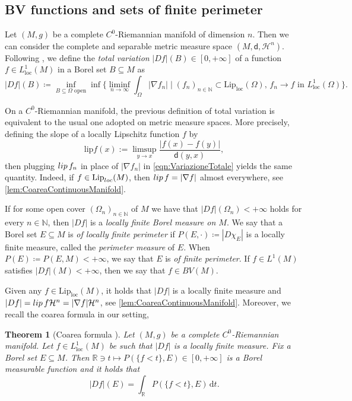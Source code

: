 \documentclass[a4paper,12pt,reqno]{amsart}
\numberwithin{equation}{section}
\theoremstyle{plain}
\newtheorem{theorem}{Theorem}[section]
\theoremstyle{definition}
\theoremstyle{remark}
\newcommand{\N}{\mathbb{N}}
\newcommand{\R}{\mathbb{R}}
\newcommand{\lip}{{\rm lip \,}}
\DeclareMathOperator{\Lip}{Lip}
\newcommand{\haus}{\mathcal{H}}
\newcommand{\dist}{\mathsf{d}}
\newcommand{\de}{\ensuremath{\,\mathrm d}} %
\begin{document}
{\subsection{BV functions and sets of finite perimeter}\label{sec:Perimeter}

Let $(M,g)$ be a complete $C^0$-Riemannian manifold of dimension $n$. Then we can consider the complete and separable metric measure space $(M,\dist,\mathcal{H}^n)$.
Following \cite{MIRANDA2003, ADM14}, we define the \emph{total variation} \(|Df|(B)\in[0,+\infty]\) of a function \(f\in L^1_{\mathrm{loc}}(M)\) in a Borel set \(B\subseteq M\) as
\begin{equation}\label{eqn:VariazioneTotale}
|Df|(B)\coloneqq\inf_{B\subseteq\Omega\text{ open}}\inf\bigg\{\liminf_{n\to\infty}\int_\Omega |\nabla f_n|\;\bigg|\;
(f_n)_{n\in\N}\subset\mathrm{Lip}_{\mathrm{loc}}(\Omega),\,f_n\to f\text{ in }L^1_{\mathrm{loc}}(\Omega)\bigg\}.
\end{equation}

\begin{remark}\label{remlip}
On a $C^0$-Riemannian manifold, the previous definition of total variation is equivalent to the usual one adopted on metric measure spaces. More precisely, defining the slope of a locally Lipschitz function $f$ by
\begin{equation}\label{eqn:lip0}
\mathrm{lip}f(x):=\limsup_{y\to x}\frac{|f(x)-f(y)|}{\dist(y,x)},
\end{equation}
then plugging $\lip f_n$ in place of $|\nabla f_n|$ in \eqref{eqn:VariazioneTotale} yields the same quantity. Indeed, if $f \in \Lip_{\rm loc}(M)$, then $\lip f = |\nabla f|$ almost everywhere, see \cref{lem:CoareaContinuousManifold}.
\end{remark}

If for some open cover \((\Omega_n)_{n\in\N}\) of \(M\) we have that \(|Df|(\Omega_n)<+\infty\) holds for every \(n\in\N\), then \(|Df|\) is a \textit{locally finite Borel measure on \(M\)}.
We say that a Borel set \(E\subseteq M\) is \emph{of locally finite perimeter} if \(P(E,\cdot)\coloneqq|D\chi_E|\) is a locally finite measure, called the \emph{perimeter measure}
of \(E\). When \(P(E)\coloneqq P(E,M)<+\infty\), we say that \(E\) is \emph{of finite perimeter}. If $f\in L^1(M)$ satisfies $|Df|(M)<+\infty$, then we say that $f\in BV(M)$.

Given any \(f\in\mathrm{Lip}_{\mathrm{loc}}(M)\), it holds that \(|Df|\) is a locally finite measure and \(| Df|=\lip f\mathcal{H}^n = |\nabla f| \haus^n\), see \cref{lem:CoareaContinuousManifold}. Moreover, we recall the coarea formula in our setting,
%
%
\begin{theorem}[Coarea formula {\cite[Proposition 4.2]{MIRANDA2003}}]\label{thm:Coarea}
Let $(M,g)$ be a complete $C^0$-Riemannian manifold. Let \(f\in L^1_{\mathrm{loc}}(M)\) be such that
\(|Df|\) is a locally finite measure. Fix a Borel set \(E\subseteq M\). Then
\(\R\ni t\mapsto P(\{f<t\},E)\in[0,+\infty]\) is a Borel measurable function and it holds that
\[
|Df|(E)=\int_\R P(\{f<t\},E)\de t.
\]
\end{theorem}

}
\end{document}
